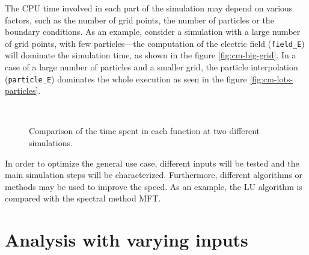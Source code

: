 \documentclass[a4paper]{report}
\begin{document}
The CPU time involved in each part of the simulation may depend on various 
factors, such as the number of grid points, the number of particles or the 
boundary conditions. As an example, consider a simulation with a large number of 
grid points, with few particles---the computation of the electric field 
(\texttt{field\_E}) will dominate the simulation time, as shown in the figure 
\ref{fig:cm-big-grid}. In a case of a large number of particles and a smaller 
grid, the particle interpolation (\texttt{particle\_E}) dominates the whole 
execution as seen in the figure \ref{fig:cm-lots-particles}.

\begin{figure}[h]
	\centering
	\\
	\caption{Comparison of the time spent in each function at two different 
	simulations.}
\end{figure}

In order to optimize the general use case, different inputs will be tested and 
the main simulation steps will be characterized. Furthermore, different 
algorithms or methods may be used to improve the speed. As an example, the LU 
algorithm is compared with the spectral method MFT.

\section{Analysis with varying inputs}



%
%

%
%
\end{document}
